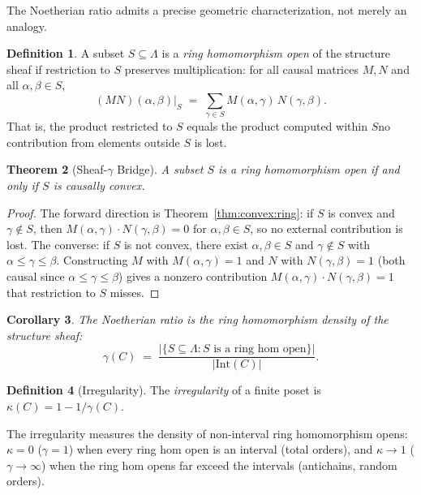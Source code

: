 \documentclass[11pt,a4paper]{article}
\theoremstyle{plain}
\newtheorem{theorem}{Theorem}[section]
\newtheorem{corollary}[theorem]{Corollary}
\theoremstyle{definition}
\newtheorem{definition}[theorem]{Definition}
\theoremstyle{remark}
\newcommand{\Int}{\mathrm{Int}}
\begin{document}
The Noetherian ratio admits a precise geometric characterization, not merely an analogy.

\begin{definition}
A subset $S \subseteq \Lambda$ is a \emph{ring homomorphism open} of the structure sheaf if restriction to $S$ preserves multiplication: for all causal matrices $M, N$ and all $\alpha, \beta \in S$,
\[
(MN)(\alpha, \beta)\big|_S \;=\; \sum_{\gamma \in S} M(\alpha, \gamma)\, N(\gamma, \beta).
\]
That is, the product restricted to $S$ equals the product computed within $S$\textemdash no contribution from elements outside $S$ is lost.
\end{definition}

\begin{theorem}[Sheaf-$\gamma$ Bridge]\label{thm:bridge:gamma}
A subset $S$ is a ring homomorphism open if and only if $S$ is causally convex.
\end{theorem}

\begin{proof}
The forward direction is Theorem~\ref{thm:convex:ring}: if $S$ is convex and $\gamma \notin S$, then $M(\alpha, \gamma) \cdot N(\gamma, \beta) = 0$ for $\alpha, \beta \in S$, so no external contribution is lost.
The converse: if $S$ is not convex, there exist $\alpha, \beta \in S$ and $\gamma \notin S$ with $\alpha \leq \gamma \leq \beta$.
Constructing $M$ with $M(\alpha, \gamma) = 1$ and $N$ with $N(\gamma, \beta) = 1$ (both causal since $\alpha \leq \gamma \leq \beta$) gives a nonzero contribution $M(\alpha, \gamma) \cdot N(\gamma, \beta) = 1$ that restriction to $S$ misses.
\end{proof}

\begin{corollary}\label{cor:gamma:sheaf}
The Noetherian ratio is the ring homomorphism density of the structure sheaf:
\[
\gamma(C) \;=\; \frac{|\{S \subseteq \Lambda : S \text{ is a ring hom open}\}|}{|\Int(C)|}.
\]
\end{corollary}

\begin{definition}[Irregularity]
The \emph{irregularity} of a finite poset is $\kappa(C) = 1 - 1/\gamma(C)$.
\end{definition}

\noindent The irregularity measures the density of non-interval ring homomorphism opens:
$\kappa = 0$ ($\gamma = 1$) when every ring hom open is an interval (total orders), and $\kappa \to 1$ ($\gamma \to \infty$) when the ring hom opens far exceed the intervals (antichains, random orders).
\end{document}
